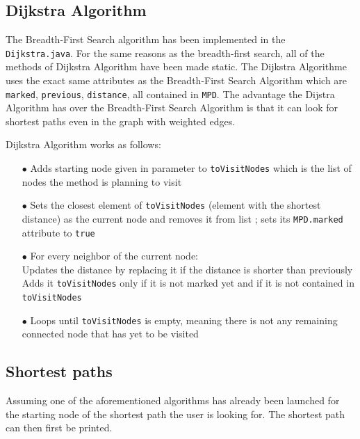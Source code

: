 \documentclass{article}
\begin{document}
\subsection{Dijkstra Algorithm}

The Breadth-First Search algorithm has been implemented in the \texttt{Dijkstra.java}. For the same reasons as the breadth-first search, all of the methods of Dijkstra Algorithm have been made static. The Dijkstra Algorithme uses the exact same attributes as the Breadth-First Search Algorithm which are \texttt{marked}, \texttt{previous}, \texttt{distance}, all contained in \texttt{MPD}. The advantage the Dijstra Algorithm has over the Breadth-First Search Algorithm is that it can look for shortest paths even in the graph with weighted edges.

Dijkstra Algorithm works as follows:

\begin{itemize}
\item[$\bullet$] Adds starting node given in parameter  to \texttt{toVisitNodes} which is the list of nodes the method is planning to visit
\item[$\bullet$] Sets the closest element of \texttt{toVisitNodes} (element with the shortest distance) as the current node and removes it from list ; sets its \texttt{MPD.marked} attribute to \texttt{true}
\item[$\bullet$] For every neighbor of the current node: 
\\ Updates the distance by replacing it if the distance is shorter than previously 
\\ Adds it \texttt{toVisitNodes} only if it is not marked yet and if it is not contained in \texttt{toVisitNodes}
\item[$\bullet$] Loops until \texttt{toVisitNodes} is empty, meaning there is not any remaining connected node that has yet to be visited
\end{itemize}

\subsection{Shortest paths}

Assuming one of the aforementioned algorithms has already been launched for the starting node of the shortest path the user is looking for. The shortest path can then first be printed.
\end{document}
